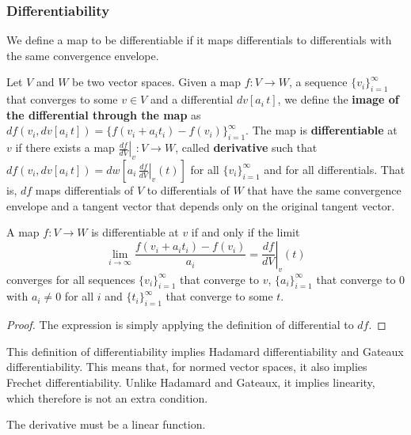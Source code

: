 \documentclass[11pt,letterpaper,fleqn]{memoir}
\begin{document}
\fi

\subsubsection{Differentiability}

We define a map to be differentiable if it maps differentials to differentials with the same convergence envelope.

\begin{defn}
	Let $V$ and $W$ be two vector spaces. Given a map $f: V \to W$, a sequence $\{v_i\}_{i=1}^{\infty}$ that converges to some $v \in V$ and a differential $dv[a_i \, t]$, we define the \textbf{image of the differential through the map} as $df(v_i, dv[a_i \, t]) = \{f(v_i + a_i t_i) - f(v_i)\}_{i=1}^{\infty}$. The map is \textbf{differentiable} at $v$ if there exists a map $\left.\frac{df}{dV} \right|_{v}: V \to W$, called \textbf{derivative} such that $df(v_i, dv[a_i \, t]) = dw[a_i \, \left.\frac{df}{dV} \right|_{v} (t)]$ for all $\{v_i\}_{i=1}^{\infty}$ and for all differentials. That is, $df$ maps differentials of $V$ to differentials of $W$ that have the same convergence envelope and a tangent vector that depends only on the original tangent vector.
\end{defn}

\begin{prop}
	A map $f : V \to W$ is differentiable at $v$ if and only if the limit
	$$ \lim\limits_{i \to \infty} \frac{f(v_i + a_i t_i) - f(v_i)}{a_i} = \left.\frac{df}{dV} \right|_{v} (t)$$
	converges for all sequences $\{v_i\}_{i=1}^{\infty}$ that converge to $v$, $\{a_i\}_{i=1}^{\infty}$ that converge to $0$ with $a_i \neq 0$ for all $i$ and $\{t_i\}_{i=1}^{\infty}$ that converge to some $t$.
\end{prop}

\begin{proof}
	The expression is simply applying the definition of differential to $df$.
\end{proof}

\begin{remark}
	This definition of differentiability implies Hadamard differentiability and Gateaux differentiability. This means that, for normed vector spaces, it also implies Frechet differentiability. Unlike Hadamard and Gateaux, it implies linearity, which therefore is not an extra condition.
\end{remark}

\begin{prop}
	The derivative must be a linear function.
\end{prop}
\end{document}
